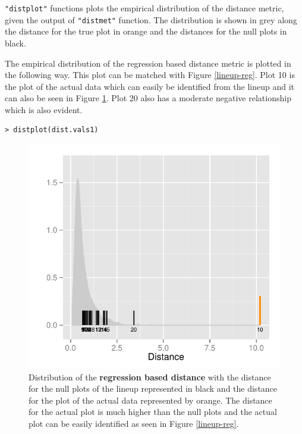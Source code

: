 \texttt{"distplot"} functions plots the empirical distribution of the
distance metric, given the output of \texttt{"distmet"} function. The
distribution is shown in grey along the distance for the true plot in
orange and the distances for the null plots in black.

\newpage

The empirical distribution of the regression based distance metric is plotted in the following way. This plot can be matched with Figure \ref{lineup-reg}. Plot 10 is the plot of the actual data which can easily be identified from the lineup and it can also be seen in Figure \ref{dist-reg}. Plot 20 also has a moderate negative relationship which is also evident. 

\begin{verbatim}
> distplot(dist.vals1)
\end{verbatim}

\begin{figure}[hbtp]
\begin{center}
\includegraphics[scale=0.7]{nullabor-distr-reg.pdf}
\caption{Distribution of the \textbf{regression based distance} with the distance for the null plots of the lineup represented in black and the distance for the plot of the actual data represented by orange. The distance for the actual plot is much higher than the null plots and the actual plot can be easily identified as seen in Figure \ref{lineup-reg}. }
\label{dist-reg}
\end{center}
\end{figure}


